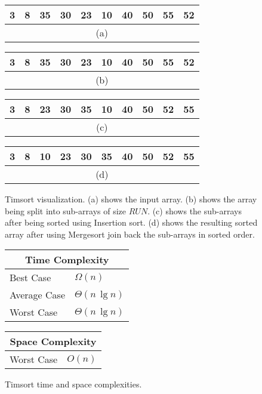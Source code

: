 \begin{figure}[!ht]
    \centering
    \begin{tabular}{|c|c|c|c|c|c|c|c|c|c|}
    \hline
    3 & 8 & 35 & 30 & 23 & 10 & 40 & 50 & 55 & 52 \\
    \hline
    \multicolumn{10}{c}{(a)} \\
    \end{tabular}
    \break
    \begin{tabular}{|c|c|c|c|c|c|c|c|c|c|}
    \hline
    3 & 8 & 35 & 30 & 23 & \cellcolor{lightgray}10 & \cellcolor{lightgray}40 & \cellcolor{lightgray}50 & \cellcolor{lightgray}55 & \cellcolor{lightgray}52 \\
    \hline
    \multicolumn{10}{c}{(b)} \\
    \end{tabular}
    \break
    \begin{tabular}{|c|c|c|c|c|c|c|c|c|c|}
    \hline
    3 & 8 & 23 & 30 & 35 & \cellcolor{lightgray}10 & \cellcolor{lightgray}40 & \cellcolor{lightgray}50 & \cellcolor{lightgray}52 & \cellcolor{lightgray}55 \\
    \hline
    \multicolumn{10}{c}{(c)} \\
    \end{tabular}
    \break
    \begin{tabular}{|c|c|c|c|c|c|c|c|c|c|}
    \hline
    \cellcolor{lightgray}3 & \cellcolor{lightgray}8 & \cellcolor{lightgray}10 & \cellcolor{lightgray}23 & \cellcolor{lightgray}30 & \cellcolor{lightgray}35 & \cellcolor{lightgray}40 & \cellcolor{lightgray}50 & \cellcolor{lightgray}52 & \cellcolor{lightgray}55 \\
    \hline
    \multicolumn{10}{c}{(d)} \\
    \end{tabular}
    
    \caption{Timsort visualization. (a) shows the input array. (b) shows the array being split into sub-arrays of size $RUN$. (c) shows the sub-arrays after being sorted using Insertion sort. (d) shows the resulting sorted array after using Mergesort join back the sub-arrays in sorted order.}
    \label{fig:timsort_ex}
\end{figure}

\begin{figure}[!ht]
    \centering
    \begin{tabular}{l|l}
    \multicolumn{2}{c}{\textbf{Time Complexity}} \\
    \hline
    Best Case    & $\Omega(n)$ \\
    Average Case & $\Theta(n \, \lg n)$ \\
    Worst Case   & $\Theta(n \, \lg n)$ \\
    \end{tabular}
    \quad\quad
    \begin{tabular}{l|l}
    \multicolumn{2}{c}{\textbf{Space Complexity}} \\
    \hline
    Worst Case   & $O(n)$
    \end{tabular}
    
    \caption{Timsort time\cite{ajnp2017} and space complexities\cite{big-o}.}
    \label{fig:timsort}
\end{figure}
